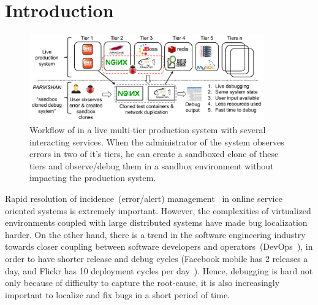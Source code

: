 \section{Introduction}
\label{sec:intro}

\begin{figure}[ht!]
	\begin{center}
		\includegraphics[width=0.9\textwidth]{figs/workflow3.pdf}
		\caption{Workflow of \parikshan in a live multi-tier production system with several interacting services. When the administrator of the system observes errors in two of it's tiers, he can create a sandboxed clone of these tiers and observe/debug them in a sandbox environment without impacting the production system.}
		\label{fig:motivation}
	\end{center}
\end{figure}

Rapid resolution of incidence~(error/alert) management~\cite{sasase2013} in online service oriented systems is extremely important.
However, the complexities of virtualized environments coupled with large distributed systems have made bug localization harder. 
On the other hand, there is a trend in the software engineering industry towards closer coupling between software developers and operators~(DevOps~\cite{devops}), in order to have shorter release and debug cycles 
(Facebook mobile has 2 releases a day, and Flickr has 10 deployment cycles per day~\cite{10DevOps}). 
Hence, debugging is hard not only because of difficulty to capture the root-cause, it is also increasingly important to localize and fix bugs in a short period of time.

